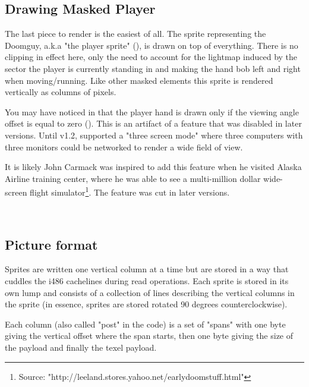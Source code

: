 \subsection{Drawing Masked Player}
The last piece to render is the easiest of all. The sprite representing the Doomguy, a.k.a "the player sprite" (), is drawn on top of everything. There is no clipping in effect here, only the need to account for the lightmap induced by the sector the player is currently standing in and making the hand bob left and right when moving/running. Like other masked elements this sprite is rendered vertically as columns of pixels.\\
\par
You may have noticed in  that the player hand is drawn only if the viewing angle offset is equal to zero (). This is an artifact of a feature that was disabled in later versions. Until v1.2, \doom{} supported a "three screen mode" where three computers with three monitors could be networked to render a wide field of view.\\
\par
{}
\par
It is likely John Carmack was inspired to add this feature when he visited Alaska Airline training center, where he was able to see a multi-million dollar wide-screen flight simulator\footnote{Source: "http://leeland.stores.yahoo.net/earlydoomstuff.html"}. The feature was cut in later versions. \\
\par
{}\\
\par

\vspace{-10pt}
\subsection{Picture format}
Sprites are written one vertical column at a time but are stored in a way that cuddles the i486 cachelines during read operations. Each sprite is stored in its own lump and consists of a collection of lines describing the vertical columns in the sprite (in essence, sprites are stored rotated 90 degrees counterclockwise).\\
\par
Each column (also called "post" in the code) is a set of "spans" with one byte giving the vertical offset where the span starts, then one byte giving the size of the payload and finally the texel payload.
\pagebreak


